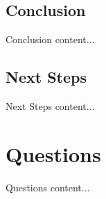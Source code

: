 \documentclass{beamer}
\begin{document}
\begin{darkframes}
    \subsection{Conclusion}
    \begin{frame}{Conclusion}
    	content...
    \end{frame}
    \subsection{Next Steps}
    \begin{frame}{Next Steps}
    	content...
    \end{frame}
    
    \section{Questions}
    \begin{frame}{Questions}
    	content...
    	\end{frame}
    
    
  \end{darkframes}
\end{document}
